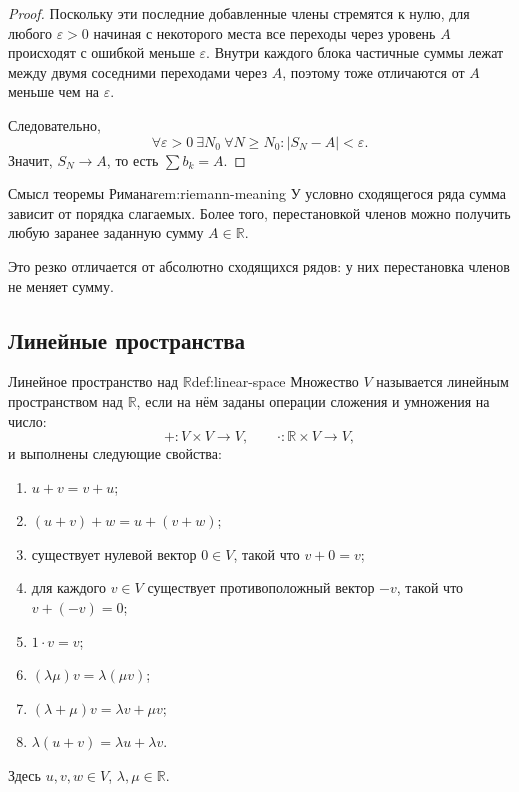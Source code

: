 \begin{proof}
	Поскольку эти последние добавленные члены стремятся к нулю, для любого \(\varepsilon>0\) начиная с некоторого места все переходы через уровень \(A\) происходят с ошибкой меньше \(\varepsilon\). Внутри каждого блока частичные суммы лежат между двумя соседними переходами через \(A\), поэтому тоже отличаются от \(A\) меньше чем на \(\varepsilon\).
	
	Следовательно,
	\[
	\forall \varepsilon>0\ \exists N_0\ \forall N\ge N_0:
	|S_N-A|<\varepsilon.
	\]
	Значит, \(S_N\to A\), то есть \(\sum b_k=A\).
\end{proof}

\begin{Remark}{Смысл теоремы Римана}{rem:riemann-meaning}
	У условно сходящегося ряда сумма зависит от порядка слагаемых. Более того, перестановкой членов можно получить любую заранее заданную сумму \(A\in\mathbb R\).
	
	Это резко отличается от абсолютно сходящихся рядов: у них перестановка членов не меняет сумму.
\end{Remark}

\subsection{Линейные пространства}

\begin{Definition}{Линейное пространство над \(\mathbb R\)}{def:linear-space}
	Множество \(V\) называется линейным пространством над \(\mathbb R\), если на нём заданы операции сложения и умножения на число:
	\[
	+:V\times V\to V,
	\qquad
	\cdot:\mathbb R\times V\to V,
	\]
	и выполнены следующие свойства:
	
	\begin{enumerate}
		\item \(u+v=v+u\);
		\item \((u+v)+w=u+(v+w)\);
		\item существует нулевой вектор \(0\in V\), такой что \(v+0=v\);
		\item для каждого \(v\in V\) существует противоположный вектор \(-v\), такой что \(v+(-v)=0\);
		\item \(1\cdot v=v\);
		\item \((\lambda\mu)v=\lambda(\mu v)\);
		\item \((\lambda+\mu)v=\lambda v+\mu v\);
		\item \(\lambda(u+v)=\lambda u+\lambda v\).
	\end{enumerate}
	
	Здесь \(u,v,w\in V\), \(\lambda,\mu\in\mathbb R\).
\end{Definition}


